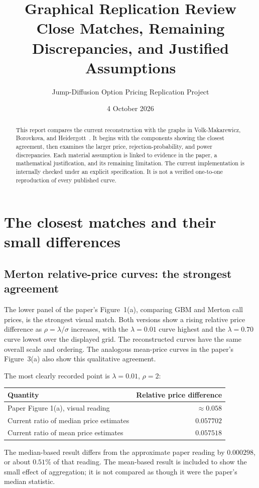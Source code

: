 \documentclass[11pt,a4paper]{article}
\title{Graphical Replication Review\\[4pt]
\large Close Matches, Remaining Discrepancies, and Justified Assumptions}
\author{Jump-Diffusion Option Pricing Replication Project}
\date{4 October 2026}
\begin{document}
\maketitle
\vspace{-8mm}
\begin{abstract}
This report compares the current reconstruction with the graphs in
Volk-Makarewicz, Borovkova, and Heidergott~\cite{paper}. It begins with
the components showing the closest agreement, then examines the larger
price, rejection-probability, and power discrepancies. Each material
assumption is linked to evidence in the paper, a mathematical justification,
and its remaining limitation. The current implementation is internally
checked under an explicit specification. It is not a verified one-to-one
reproduction of every published curve.
\end{abstract}

\section{The closest matches and their small differences}
\subsection{Merton relative-price curves: the strongest agreement}
The lower panel of the paper's Figure~1(a), comparing GBM and Merton
call prices, is the strongest visual match. Both versions show a rising
relative price difference as $\rho=\lambda/\sigma$ increases, with the
$\lambda=0.01$ curve highest and the $\lambda=0.70$ curve lowest over
the displayed grid. The reconstructed curves have the same overall
scale and ordering. The analogous mean-price curves in the paper's
Figure~3(a) also show this qualitative agreement.

The most clearly recorded point is $\lambda=0.01$, $\rho=2$:
\begin{center}
\begin{tabular}{@{}lr@{}}
\toprule
Quantity & Relative price difference\\
\midrule
Paper Figure 1(a), visual reading & $\approx 0.058$\\
Current ratio of median price estimates & $0.057702$\\
Current ratio of mean price estimates & $0.057518$\\
\bottomrule
\end{tabular}
\end{center}
The median-based result differs from the approximate paper reading by
$0.000298$, or about $0.51\%$ of that reading. The mean-based result is
included to show the small effect of aggregation; it is not compared
as though it were the paper's median statistic.
\end{document}
